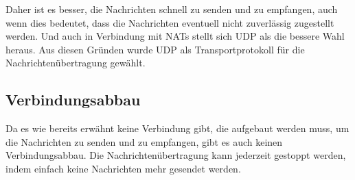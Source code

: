 Daher ist es besser, die Nachrichten schnell zu senden und zu empfangen, auch wenn dies bedeutet, dass die Nachrichten eventuell nicht zuverlässig zugestellt werden. Und auch in Verbindung mit NATs stellt sich UDP als die bessere Wahl heraus. Aus diesen Gründen wurde UDP als Transportprotokoll für die Nachrichtenübertragung gewählt.


\subsection{Verbindungsabbau}

Da es wie bereits erwähnt keine Verbindung gibt, die aufgebaut werden muss, um die Nachrichten zu senden und zu empfangen, gibt es auch keinen Verbindungsabbau. Die Nachrichtenübertragung kann jederzeit gestoppt werden, indem einfach keine Nachrichten mehr gesendet werden. 